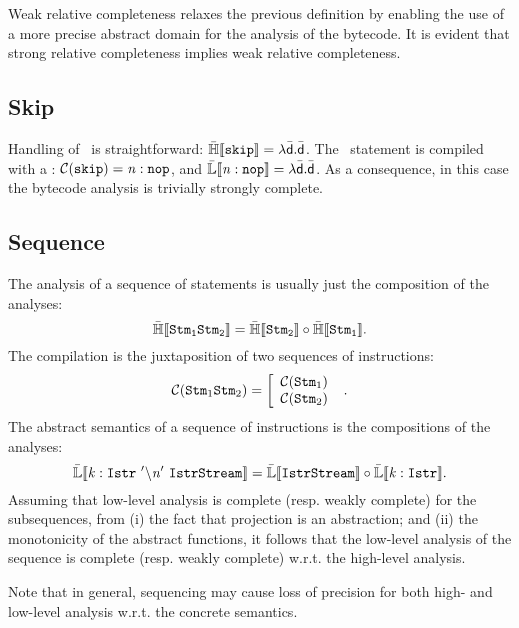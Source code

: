\documentclass{llncs}
\begin{document}
Weak relative completeness relaxes the previous definition by enabling
the use of a more precise abstract domain for the analysis of the
bytecode.  It is evident that strong relative completeness
implies weak relative completeness.

\subsection{Skip}
Handling of \Skip\ is straightforward:
$\mathbb{\bar{H}}\llbracket \mathtt{\mathtt{skip}} \rrbracket = \lambda \bar{\mathsf{d}}.\bar{\mathsf{d}}$.
The \Skip\ statement is compiled with a \Nop: $\mathcal{C}(\mathtt{skip}) = \mathit{n}: \mathtt{nop}$, and $\mathbb{\bar{L}}\llbracket \mathtt{\mathit{n}: \mathtt{nop}} \rrbracket = \lambda \bar{\mathsf{d}}.\bar{\mathsf{d}}$.
As a consequence, in this case the bytecode analysis is trivially strongly complete. 

\subsection{Sequence}
The analysis of a sequence of statements is usually just the composition of the analyses:
\begin{equation}
\mathbb{\bar{H}}\llbracket \mathtt{\mathtt{Stm}_1 \mathtt{Stm}_2} \rrbracket = \mathbb{\bar{H}}\llbracket \mathtt{\mathtt{Stm}_2} \rrbracket \circ \mathbb{\bar{H}}\llbracket \mathtt{\mathtt{Stm}_1} \rrbracket.
\label{eq:seqHL}
\end{equation}
The compilation is the juxtaposition of two sequences of instructions: 
\[
\mathcal{C}(\mathtt{Stm}_1 \mathtt{Stm}_2) = \left [ \begin{array}{ll}\mathcal{C}(\mathtt{Stm}_1)\\ \mathcal{C}(\mathtt{Stm}_2) \end{array} \right. \ .
\]
The abstract semantics of a sequence of instructions is the compositions of the analyses: 
\begin{equation}
\mathbb{\bar{L}}\llbracket \mathtt{\mathit{k}: \mathtt{Istr}\ '\text{\textbackslash} \mathit{n}'\ \mathtt{IstrStream}} \rrbracket = \mathbb{\bar{L}}\llbracket \mathtt{\mathtt{IstrStream}} \rrbracket \circ \mathbb{\bar{L}}\llbracket \mathtt{\mathit{k}: \mathtt{Istr}} \rrbracket.
\label{eq:seqLL}
\end{equation}
Assuming that low-level analysis is complete (resp. weakly complete)
for the subsequences, from (i) the fact that projection is an abstraction; and (ii) the monotonicity of the abstract functions, it follows that
the low-level analysis of the sequence is complete (resp. weakly complete) w.r.t. the high-level analysis.

Note that in general, sequencing may cause loss of precision for both
high- and low-level analysis w.r.t. the concrete semantics.
\end{document}
